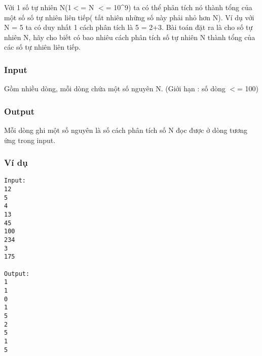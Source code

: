 



   Với 1 số tự nhiên N(1$<$= N $<$= 10\textasciicircum9) ta có thể phân tích nó thành tổng của một số số tự nhiên liên tiếp( tất nhiên những số này phải nhỏ hơn N). Ví dụ với N = 5 ta có duy nhất 1 cách phân tích là 5 = 2+3.      Bài toán đặt ra là cho số tự nhiên N, hãy cho biết có bao nhiêu cách phân tích số tự nhiên N thành tổng của các số tự nhiên liên tiếp.  

\subsubsection{   Input  }

   Gồm nhiều dòng, mỗi dòng chứa một số nguyên N. (Giới hạn : số dòng $<$= 100)  

\subsubsection{   Output  }

   Mỗi dòng ghi một số nguyên là số cách phân tích số N đọc được ở dòng tương ứng trong input.  

\subsubsection{   Ví dụ  }
\begin{verbatim}
Input:
12
5
4
13
45
100
234
3
175

Output:
1
1
0
1
5
2
5
1
5
\end{verbatim}